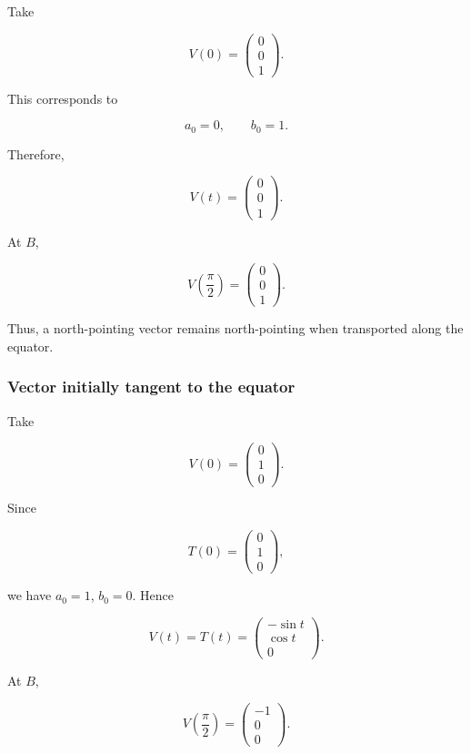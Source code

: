 \documentclass[12pt,a4paper]{article}
\theoremstyle{notespace}
\begin{document}
Take

\[
V(0)
=
\begin{pmatrix}
	0\\
	0\\
	1
\end{pmatrix}.
\]

This corresponds to

\[
a_0=0,
\qquad
b_0=1.
\]

Therefore,

\[
V(t)
=
\begin{pmatrix}
	0\\
	0\\
	1
\end{pmatrix}.
\]

At \(B\),

\[
\boxed{
	V\left(\frac{\pi}{2}\right)
	=
	\begin{pmatrix}
		0\\
		0\\
		1
	\end{pmatrix}.
}
\]

Thus, a north-pointing vector remains north-pointing when transported
along the equator.

\subsubsection{Vector initially tangent to the equator}

Take

\[
V(0)
=
\begin{pmatrix}
	0\\
	1\\
	0
\end{pmatrix}.
\]

Since

\[
T(0)
=
\begin{pmatrix}
	0\\
	1\\
	0
\end{pmatrix},
\]

we have \(a_0=1\), \(b_0=0\). Hence

\[
V(t)=T(t)
=
\begin{pmatrix}
	-\sin t\\
	\cos t\\
	0
\end{pmatrix}.
\]

At \(B\),

\[
\boxed{
	V\left(\frac{\pi}{2}\right)
	=
	\begin{pmatrix}
		-1\\
		0\\
		0
	\end{pmatrix}.
}
\]
\end{document}
